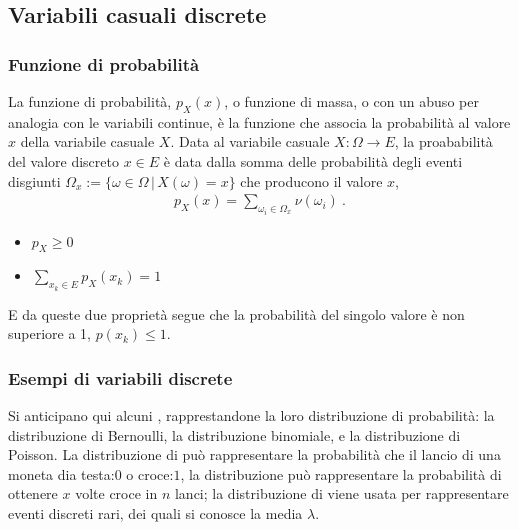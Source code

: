 \documentclass[letterpaper,10pt,italian]{jupyterBook}
\begin{document}
\sphinxstepscope


\subsection{Variabili casuali discrete}
\label{\detokenize{ch/statistics/random_variables_discrete:variabili-casuali-discrete}}\label{\detokenize{ch/statistics/random_variables_discrete:statistics-hs-random-variables-discrete}}\label{\detokenize{ch/statistics/random_variables_discrete::doc}}

\subsubsection{Funzione di probabilità}
\label{\detokenize{ch/statistics/random_variables_discrete:funzione-di-probabilita}}
\sphinxAtStartPar
La funzione di probabilità, \(p_X(x)\), o funzione di massa, o  con un abuso per analogia con le variabili continue, è la funzione che associa la probabilità al valore \(x\) della variabile casuale \(X\). Data al variabile casuale \(X: \Omega \rightarrow E\), la proababilità del valore discreto \(x \in E\) è data dalla somma delle probabilità degli eventi disgiunti \(\Omega_x := \{ \omega \in \Omega \, | \, X(\omega) = x \}\) che producono il valore \(x\),
\begin{equation*}
\begin{split}p_X(x) = \sum_{\omega_i \in \Omega_x} \nu(\omega_i) \ .\end{split}
\end{equation*}
\sphinxAtStartPar
{}
\begin{itemize}
\item {} 
\sphinxAtStartPar
\(p_X \ge 0\)

\item {} 
\sphinxAtStartPar
\(\sum_{x_k \in E} p_X(x_k) = 1\)

\end{itemize}

\sphinxAtStartPar
E da queste due proprietà segue che la probabilità del singolo valore è non superiore a 1, \(p(x_k) \le 1\).


\subsubsection{Esempi di variabili discrete}
\label{\detokenize{ch/statistics/random_variables_discrete:esempi-di-variabili-discrete}}
\sphinxAtStartPar
Si anticipano qui alcuni {\hyperref[\detokenize{ch/statistics::doc}]{}}, rapprestandone la loro distribuzione di probabilità: la distribuzione di Bernoulli, la distribuzione binomiale, e la distribuzione di Poisson. La distribuzione di  può rappresentare la probabilità che il lancio di una moneta dia testa:\(0\) o croce:\(1\), la distribuzione  può rappresentare la probabilità di ottenere \(x\) volte croce in \(n\) lanci; la distribuzione di  viene usata per rappresentare eventi discreti rari, dei quali si conosce la media \(\lambda\).
\end{document}
